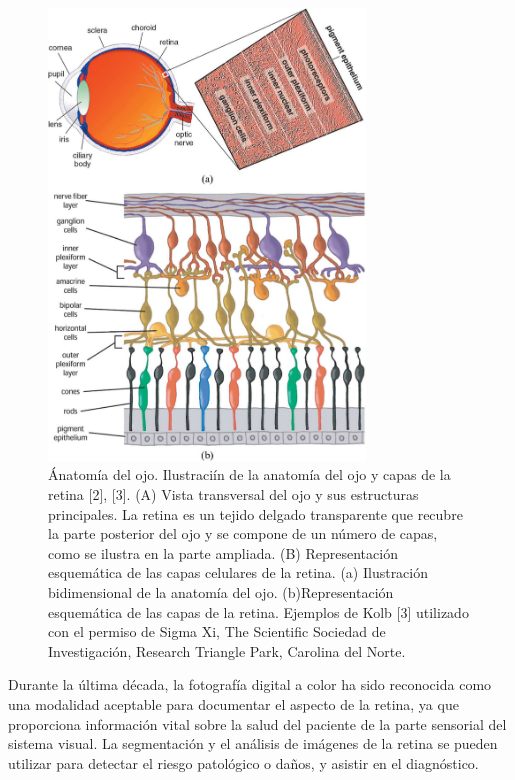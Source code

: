 \begin{figure}[H]
	{
	\centering
	\includegraphics[width=0.75\textwidth]{Figures/ojo}
	\caption[Anatom\'ia del ojo 0-200]{\'Anatom\'ia del ojo. Ilustraci\'in de la anatom\'ia del ojo y capas de la retina [2], [3]. (A) Vista transversal del ojo y sus estructuras principales. La retina es un tejido delgado transparente que recubre la parte posterior del ojo y se compone de un n\'umero de capas, como se ilustra en la parte ampliada. (B) Representaci\'on esquem\'atica de las capas celulares de la retina. (a) Ilustraci\'on bidimensional de la anatom\'ia del ojo. (b)Representaci\'on esquem\'atica de las capas de la retina. Ejemplos de Kolb [3] utilizado con el permiso de Sigma Xi, The Scientific Sociedad de Investigación, Research Triangle Park, Carolina del Norte.}
	\label{fig:AnatomiaDelOjo}
	}
\end{figure}	

Durante la \'ultima d\'ecada, la fotograf\'ia digital a color ha sido reconocida como una modalidad aceptable para documentar el aspecto de la retina, ya que proporciona informaci\'on vital sobre la salud del paciente de la parte sensorial del sistema visual. La segmentaci\'on y el an\'alisis de im\'agenes de la retina se pueden utilizar para detectar el riesgo patol\'ogico o da\~nos, y asistir en el diagn\'ostico. 

